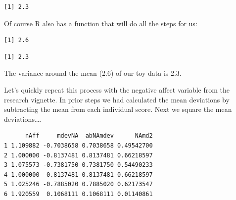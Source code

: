 \documentclass[
  11pt,
]{book}
\newenvironment{Shaded}{\begin{snugshade}}{\end{snugshade}}
\newcommand{\AttributeTok}[1]{\textcolor[rgb]{0.27,0.27,0.27}{#1}}
\newcommand{\ConstantTok}[1]{\textcolor[rgb]{0.37,0.37,0.37}{#1}}
\newcommand{\FunctionTok}[1]{\textcolor[rgb]{0.27,0.27,0.27}{\textbf{#1}}}
\newcommand{\NormalTok}[1]{#1}
\newcommand{\OtherTok}[1]{\textcolor[rgb]{0.37,0.37,0.37}{#1}}
\newcommand{\SpecialCharTok}[1]{\textcolor[rgb]{0.43,0.43,0.43}{\textbf{#1}}}
\begin{document}
\begin{verbatim}
[1] 2.3
\end{verbatim}

Of course R also has a function that will do all the steps for us:

\begin{Shaded}
\end{Shaded}

\begin{verbatim}
[1] 2.6
\end{verbatim}

\begin{Shaded}
\end{Shaded}

\begin{verbatim}
[1] 2.3
\end{verbatim}

The variance around the mean (2.6) of our toy data is 2.3.

Let's quickly repeat this process with the negative affect variable from the research vignette. In prior steps we had calculated the mean deviations by subtracting the mean from each individual score. Next we square the mean deviations\ldots.

\begin{Shaded}
\end{Shaded}

\begin{verbatim}
      nAff     mdevNA  abNAmdev      NAmd2
1 1.109882 -0.7038658 0.7038658 0.49542700
2 1.000000 -0.8137481 0.8137481 0.66218597
3 1.075573 -0.7381750 0.7381750 0.54490233
4 1.000000 -0.8137481 0.8137481 0.66218597
5 1.025246 -0.7885020 0.7885020 0.62173547
6 1.920559  0.1068111 0.1068111 0.01140861
\end{verbatim}
\end{document}
